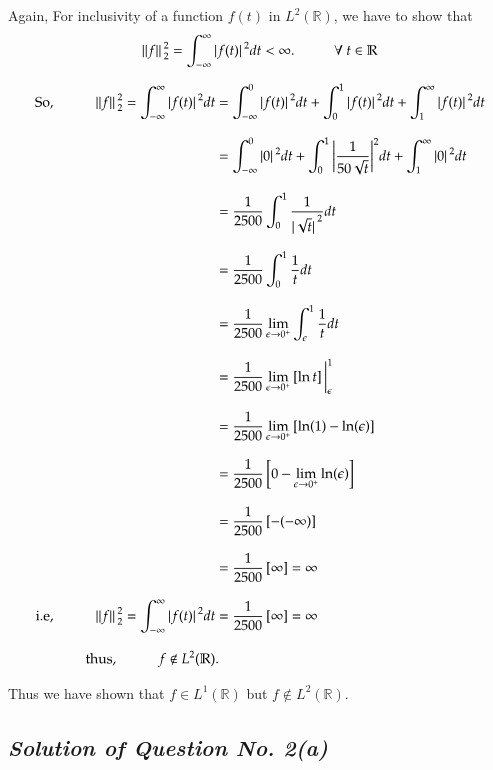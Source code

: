 \documentclass[12pt, a4paper]{article} %
\begin{document}
\pagebreak 


\BgThispage
Again, For inclusivity of a function $f(t)$ in $L^2(\mathbb{R})$, we have to show that 
\[\norm*{f}_2^2 = \int_{-\infty}^{\infty}\abs*{f(t)}^2dt < \infty.\hspace*{1cm} \forall\ t\in \mathbb{R}\]

\begin{equation*}
    \begin{split}
        \mbox{So}, \hspace*{1cm} \norm*{f}_2^2 = \int_{-\infty}^{\infty}\abs*{f(t)}^2dt & =  \int_{-\infty}^{0}\abs*{f(t)}^2dt + \int_{0}^{1}\abs*{f(t)}^2dt + \int_{1}^{\infty}\abs*{f(t)}^2dt\\[3mm]
        & = \int_{-\infty}^{0}\abs*{0}^2dt + \int_{0}^{1}\bigg|\frac{1}{50\sqrt{t}}\bigg|^2dt + \int_{1}^{\infty}\abs*{0}^2dt\\[3mm]
        & = \frac{1}{2500}\int_{0}^{1}\frac{1}{\abs*{\sqrt{t}}^2}dt\\[3mm]
        & =\frac{1}{2500} \int_{0}^{1}\frac{1}{t} dt\\[3mm]
        & =\frac{1}{2500} \lim_{\epsilon\to 0^+}\int_{\epsilon}^{1}\frac{1}{t} dt\\[3mm]
        & = \frac{1}{2500}\lim_{\epsilon\to 0^+}\left[\ln t\right]\bigg|_{\epsilon}^{1}\\[3mm]
        & = \frac{1}{2500}\lim_{\epsilon\to 0^+}\left[\ln (1)-\ln(\epsilon)\right]\\[3mm]
        & = \frac{1}{2500}\left[0 - \lim_{\epsilon\to 0^+}\ln(\epsilon)\right]\\[3mm]
        & = \frac{1}{2500}\left[-(-\infty)\right]\\[3mm]
        & = \frac{1}{2500}\left[\infty\right] = \infty\\[3mm]
        \mbox{i.e}, \hspace*{1cm} \norm*{f}_2^2 = \int_{-\infty}^{\infty}\abs*{f(t)}^2dt & = \frac{1}{2500}\left[\infty\right] = \infty \\[3mm]
        \mbox{thus}, \hspace*{1cm} f\notin L^2(\mathbb{R}) &.
    \end{split}
\end{equation*}

Thus we have shown that $f\in L^1(\mathbb{R})$ but $f\notin L^2(\mathbb{R})$.
\pagebreak

\subsection{\slshape Solution of Question No. 2(a)}
\end{document}
